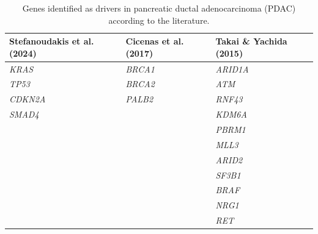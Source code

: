 \begin{table}[H]
\centering
\label{tab:literature_genes}
\begin{tabular}{lll}
\toprule
\textbf{Stefanoudakis et al. (2024)} & \textbf{Cicenas et al. (2017)} & \textbf{Takai \& Yachida (2015)} \\
\midrule
\textit{KRAS}    & \textit{BRCA1}    & \textit{ARID1A}  \\
\textit{TP53}    & \textit{BRCA2}    & \textit{ATM}     \\
\textit{CDKN2A}  & \textit{PALB2}    & \textit{RNF43}   \\
\textit{SMAD4}   &                   & \textit{KDM6A}   \\
                 &                   & \textit{PBRM1}   \\
                 &                   & \textit{MLL3} \\
                 &                   & \textit{ARID2}   \\
                 &                   & \textit{SF3B1}   \\
                 &                   & \textit{BRAF}    \\
                 &                   & \textit{NRG1}    \\
                 &                   & \textit{RET}     \\
\bottomrule
\end{tabular}
\caption{Genes identified as drivers in pancreatic ductal adenocarcinoma (PDAC) according to the literature.}
\end{table}
